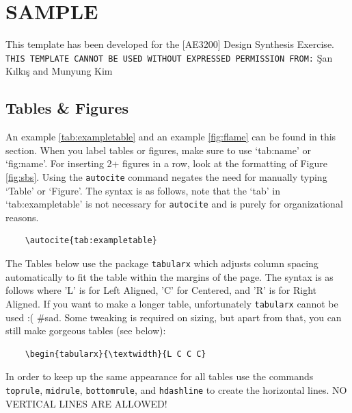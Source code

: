 \chapter{SAMPLE}

This template has been developed for the [AE3200] Design Synthesis Exercise. \texttt{THIS TEMPLATE CANNOT BE USED WITHOUT EXPRESSED PERMISSION FROM:} \c{S}an K{\i}lk{\i}\c{s} and Munyung Kim

\section{Tables \& Figures}
An example \autoref{tab:exampletable} and an example \autoref{fig:flame} can be found in this section. When you label tables or figures, make sure to use `tab:name' or `fig:name'. For inserting 2+ figures in a row, look at the formatting of Figure \autoref{fig:sbs}. Using the \texttt{autocite} command negates the need for manually typing `Table' or `Figure'. The syntax is as follows, note that the `tab' in `tab:exampletable' is not necessary for \texttt{autocite} and is purely for organizational reasons.

\begin{verbatim}
    \autocite{tab:exampletable}
\end{verbatim}

The Tables below use the package \texttt{tabularx} which adjusts column spacing automatically to fit the table within the margins of the page. The syntax is as follows where 'L' is for Left Aligned, 'C' for Centered, and 'R' is for Right Aligned. If you want to make a longer table, unfortunately \texttt{tabularx} cannot be used :( \#sad. Some tweaking is required on sizing, but apart from that, you can still make gorgeous tables (see below):

\begin{verbatim}
    \begin{tabularx}{\textwidth}{L C C C}
\end{verbatim}

In order to keep up the same appearance for all tables use the commands \texttt{toprule}, \texttt{midrule}, \texttt{bottomrule}, and \texttt{hdashline} to create the horizontal lines. NO VERTICAL LINES ARE ALLOWED!

